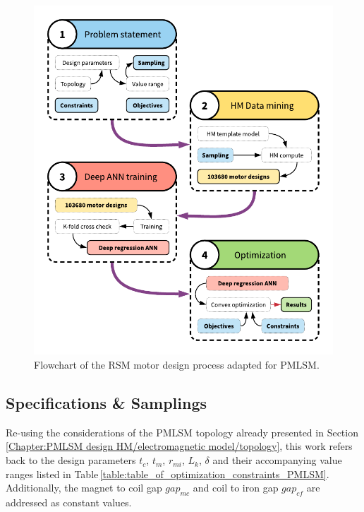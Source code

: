         
        \begin{figure}[h]
            \centering
            \includegraphics[width=4.5in]{chap4/images/optimization_process_RSM_for_PMLSM.pdf}
            \caption{Flowchart of the RSM motor design process adapted for PMLSM.}
            \label{fig:chapter/rsm/PMLSM optimization}
        \end{figure}
        
        
        \subsection{Specifications \& Samplings}    \label{Chapter:RSM/PMLSM/spec}
        
        
            Re-using the considerations of the \acs{PMLSM} topology already presented in Section\,\ref{Chapter:PMLSM design HM/electromagnetic model/topology}, this work refers back to the design parameters $t_c$, $t_m$, $r_{mi}$, $L_k$, $\delta$ and their accompanying value ranges listed in Table\,\ref{table:table_of_optimization_constraints_PMLSM}. Additionally, the magnet to coil gap $gap_{mc}$ and coil to iron gap $gap_{cf}$ are addressed as constant values. 
            
